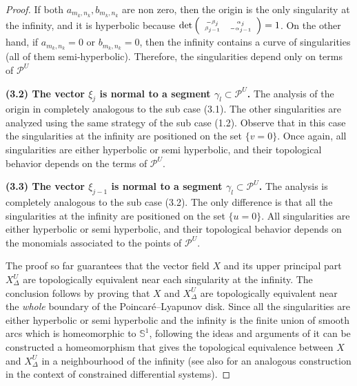 \documentclass[12pt]{amsart}
\begin{document}
\begin{proof}
If both $a_{m_{k},n_{k}}, b_{m_{k},n_{k}}$ are non zero, then the origin is the only singularity at the infinity, and it is hyperbolic because $\tiny\det\left(
  \begin{array}{cc}
    -\beta_{j} & \alpha_{j} \\
    \beta_{j-1} & -\alpha_{j-1} \\
  \end{array}
\right) = 1$. On the other hand, if $a_{m_{k},n_{k}} = 0$ or $b_{m_{k},n_{k}} = 0$, then the infinity contains a curve of singularities (all of them semi-hyperbolic). Therefore, the singularities depend only on terms of $\mathcal{P}^{U}$

\textbf{(3.2) The vector $\xi_{j}$ is normal to a segment $\gamma_{l}\subset\mathcal{P}^{U}$.} The analysis of the origin in completely analogous to the sub case (3.1). The other singularities are analyzed using the same strategy of the sub case (1.2). Observe that in this case the singularities at the infinity are positioned on the set $\{v = 0\}$. Once again, all singularities are either hyperbolic or semi hyperbolic, and their topological behavior depends on the terms of $\mathcal{P}^{U}$.

\textbf{(3.3) The vector $\xi_{j-1}$ is normal to a segment $\gamma_{l}\subset\mathcal{P}^{U}$.} The analysis is completely analogous to the sub case (3.2). The only difference is that all the singularities at the infinity are positioned on the set $\{u = 0\}$. All singularities are either hyperbolic or semi hyperbolic, and their topological behavior depends on the monomials associated to the points of $\mathcal{P}^{U}$.

The proof so far guarantees that the vector field $X$ and its upper principal part $X_{\Delta}^{U}$ are topologically equivalent near each singularity at the infinity. The conclusion follows by proving that $X$ and $X_{\Delta}^{U}$ are topologically equivalent near the \emph{whole} boundary of the Poincaré--Lyapunov disk. Since all the singularities are either hyperbolic or semi hyperbolic and the infinity is the finite union of smooth arcs which is homeomorphic to $\mathbb{S}^{1}$, following the ideas and arguments of \cite[Theorem B]{Dumortier77} it can be constructed a homeomorphism that gives the topological equivalence between $X$ and $X_{\Delta}^{U}$ in a neighbourhood of the infinity (see also \cite[Theorem A]{PerezSilva2} for an analogous construction in the context of constrained differential systems).


\end{proof}
\end{document}
